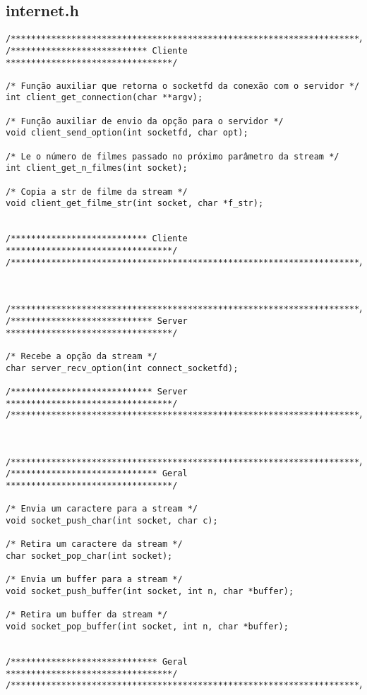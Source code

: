 \documentclass[11pt,twoside]{article}
\begin{document}
\subsection{internet.h}     %
\begin{verbatim}
/*********************************************************************/
/*************************** Cliente *********************************/

/* Função auxiliar que retorna o socketfd da conexão com o servidor */
int client_get_connection(char **argv);

/* Função auxiliar de envio da opção para o servidor */
void client_send_option(int socketfd, char opt);

/* Le o número de filmes passado no próximo parâmetro da stream */
int client_get_n_filmes(int socket);

/* Copia a str de filme da stream */
void client_get_filme_str(int socket, char *f_str);


/*************************** Cliente *********************************/
/*********************************************************************/



/*********************************************************************/
/**************************** Server *********************************/

/* Recebe a opção da stream */
char server_recv_option(int connect_socketfd);

/**************************** Server *********************************/
/*********************************************************************/



/*********************************************************************/
/***************************** Geral *********************************/

/* Envia um caractere para a stream */
void socket_push_char(int socket, char c);

/* Retira um caractere da stream */
char socket_pop_char(int socket);

/* Envia um buffer para a stream */
void socket_push_buffer(int socket, int n, char *buffer);

/* Retira um buffer da stream */
void socket_pop_buffer(int socket, int n, char *buffer);


/***************************** Geral *********************************/
/*********************************************************************/
\end{verbatim}
\end{document}
